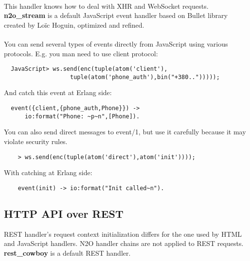 \paragraph{}
This handler knows how to deal with XHR and WebSocket requests.
{\bf {n2o}\_{stream}} is a default JavaScript event handler
based on Bullet library created by Loïc Hoguin, optimized and refined.

\paragraph{}
You can send several types of events directly from JavaScript
using various protocols. E.g. you man need to use client protocol:

\vspace{1\baselineskip}
\begin{lstlisting}
  JavaScript> ws.send(enc(tuple(atom('client'),
                   tuple(atom('phone_auth'),bin("+380..")))));
\end{lstlisting}
\vspace{1\baselineskip}

And catch this event at Erlang side:

\vspace{1\baselineskip}
\begin{lstlisting}
  event({client,{phone_auth,Phone}}) ->
      io:format("Phone: ~p~n",[Phone]).
\end{lstlisting}
\vspace{1\baselineskip}

You can also send direct messages to event/1, but use it carefully
because it may violate security rules.

\vspace{1\baselineskip}
\begin{lstlisting}
    > ws.send(enc(tuple(atom('direct'),atom('init'))));
\end{lstlisting}
\vspace{1\baselineskip}

With catching at Erlang side:

\vspace{1\baselineskip}
\begin{lstlisting}
    event(init) -> io:format("Init called~n").
\end{lstlisting}
\vspace{1\baselineskip}

\newpage
\subsection{HTTP API over REST}
REST handler's request context initialization differs for the one
used by HTML and JavaScript handlers. N2O handler chains are not
applied to REST requests. {\bf rest\_cowboy} is a default REST
handler.

